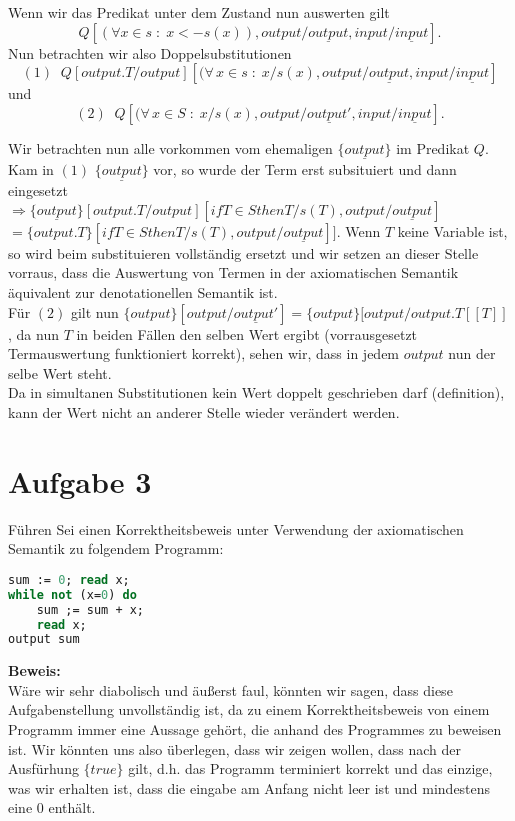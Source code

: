 \documentclass[11pt,a4paper,ngerman]{article}
\begin{document}
Wenn wir das Predikat unter dem Zustand nun auswerten gilt
$$
Q[(\forall x\in s \; : \; x <- s(x)), output / \underline{output}, input / \underline{input}].
$$
Nun betrachten wir also Doppelsubstitutionen
$$
(1) \;\; Q[output.T/output][(\forall \, x \in s \; : \; x / s(x), output / \underline{output}, input / \underline{input}]
$$
und
$$
(2) \;\; Q[(\forall \, x \in S \; : \; x / s(x), output / \underline{output'}, input / \underline{input}].
$$

Wir betrachten nun alle vorkommen vom ehemaligen $\{\underline{output} \}$ im Predikat $Q$.
Kam in $(1)$ $\{\underline{output}\}$ vor, so wurde der Term erst subsituiert und dann eingesetzt\\
$\Rightarrow \{\underline{output}\}[output.T/output][if T \in S then T / s(T) , output / \underline{output}]$
\\$= \{output.T\}[if T \in S then T / s(T), output / \underline{output}]]$. Wenn $T$ keine Variable ist,
so wird beim substituieren vollständig ersetzt und wir setzen an dieser Stelle vorraus, dass die
Auswertung von Termen in der axiomatischen Semantik äquivalent zur denotationellen Semantik ist.\\

Für $(2)$ gilt nun $\{output\}[output / \underline{output'}] = \{output\} [ output / output.T[\![T]\!]$, da nun
$T$ in beiden Fällen den selben Wert ergibt (vorrausgesetzt Termauswertung funktioniert korrekt), sehen wir,
dass in jedem $output$ nun der selbe Wert steht.\\

Da in simultanen Substitutionen kein Wert doppelt geschrieben darf (definition), kann der Wert nicht an anderer Stelle wieder verändert werden.

\section*{Aufgabe 3}
Führen Sei einen Korrektheitsbeweis unter Verwendung der axiomatischen Semantik zu
folgendem Programm:\\
\begin{lstlisting}[language=Pascal]
sum := 0; read x;
while not (x=0) do
    sum ;= sum + x;
    read x;
output sum
\end{lstlisting}

\textbf{Beweis:}\\

Wäre wir sehr diabolisch und äußerst faul, könnten wir sagen, dass diese Aufgabenstellung unvollständig ist,
da zu einem Korrektheitsbeweis von einem Programm immer eine Aussage gehört, die anhand des Programmes zu
beweisen ist. Wir könnten uns also überlegen, dass wir zeigen wollen, dass nach der Ausfürhung $\{true\}$ gilt, d.h. das Programm terminiert korrekt und das einzige, was wir erhalten ist, dass die eingabe am Anfang nicht leer ist und mindestens eine 0 enthält.\\
\end{document}
